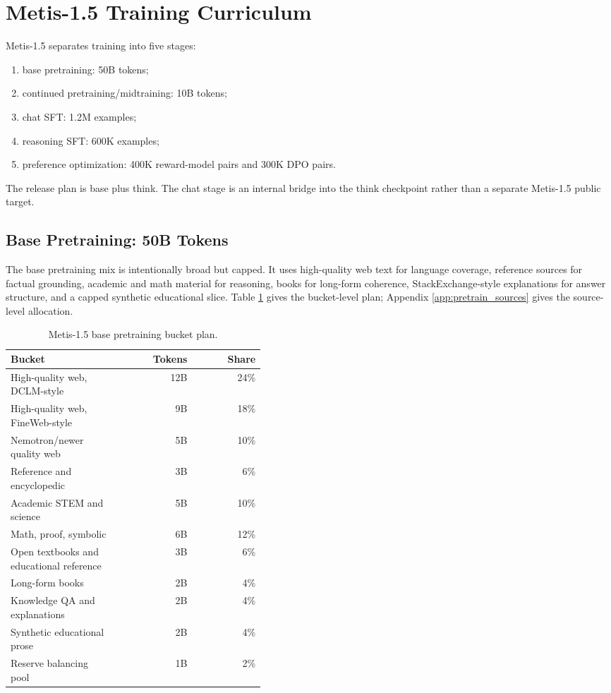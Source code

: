 \documentclass[11pt]{article}
\begin{document}
\section{Metis-1.5 Training Curriculum}

Metis-1.5 separates training into five stages:

\begin{enumerate}
  \item base pretraining: 50B tokens;
  \item continued pretraining/midtraining: 10B tokens;
  \item chat SFT: 1.2M examples;
  \item reasoning SFT: 600K examples;
  \item preference optimization: 400K reward-model pairs and 300K DPO pairs.
\end{enumerate}

The release plan is base plus think. The chat stage is an internal bridge into
the think checkpoint rather than a separate Metis-1.5 public target.

\subsection{Base Pretraining: 50B Tokens}

The base pretraining mix is intentionally broad but capped. It uses high-quality
web text for language coverage, reference sources for factual grounding,
academic and math material for reasoning, books for long-form coherence,
StackExchange-style explanations for answer structure, and a capped synthetic
educational slice. Table \ref{tab:pretrain_buckets} gives the bucket-level plan;
Appendix \ref{app:pretrain_sources} gives the source-level allocation.

\begin{table}[h]
\centering
\begin{tabular}{p{0.42\linewidth}r r}
\toprule
Bucket & Tokens & Share \\
\midrule
High-quality web, DCLM-style & 12B & 24\% \\
High-quality web, FineWeb-style & 9B & 18\% \\
Nemotron/newer quality web & 5B & 10\% \\
Reference and encyclopedic & 3B & 6\% \\
Academic STEM and science & 5B & 10\% \\
Math, proof, symbolic & 6B & 12\% \\
Open textbooks and educational reference & 3B & 6\% \\
Long-form books & 2B & 4\% \\
Knowledge QA and explanations & 2B & 4\% \\
Synthetic educational prose & 2B & 4\% \\
Reserve balancing pool & 1B & 2\% \\
\bottomrule
\end{tabular}
\caption{Metis-1.5 base pretraining bucket plan.}
\label{tab:pretrain_buckets}
\end{table}
\end{document}
